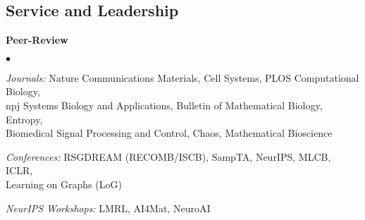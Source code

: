 \documentclass[margin,line]{res}
\newenvironment{list2}{
  \begin{list}{$\bullet$}{
      \setlength{\itemsep}{0in}
      \setlength{\parsep}{0in} \setlength{\parskip}{0in}
      \setlength{\topsep}{0in} \setlength{\partopsep}{0in}
      \setlength{\leftmargin}{0.2in}}}{\end{list}}
\begin{document}
\begin{resume}
\section{\sc Service and Leadership}

\textbf{Peer-Review}

\vspace*{.2cm}
\begin{list2}
\itemindent=-13pt
\setlength\itemsep{0.5em}
\item[] \textit{Journals:} \hspace*{1.42em} Nature Communications Materials, Cell Systems, PLOS Computational Biology, \\ 
\hspace*{4.7em} npj Systems Biology and Applications, Bulletin of Mathematical Biology, Entropy,\\
\hspace*{4.7em} Biomedical Signal Processing and Control, Chaos, Mathematical Bioscience
\item[] \textit{Conferences:} \hspace*{0.1em} RSGDREAM (RECOMB/ISCB), SampTA, NeurIPS, MLCB, ICLR, \\
\hspace*{5.0em} Learning on Graphs (LoG)
\item[] \textit{NeurIPS Workshops:} LMRL, AI4Mat, NeuroAI
\end{list2}



\end{resume}
\end{document}
